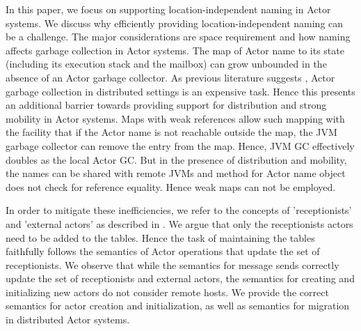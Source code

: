 In this paper, we focus on supporting location-independent naming in Actor systems. We discuss why efficiently providing location-independent naming can be a challenge. The major considerations are space requirement and how naming affects garbage collection in Actor systems. The map of Actor name to its state (including its execution stack and the mailbox) can grow unbounded in the absence of an Actor garbage collector. As previous literature suggests \cite{iwmm92}, Actor garbage collection in distributed settings is an expensive task. Hence this presents an additional barrier towards providing support for distribution and strong mobility in Actor systems. Maps with weak references \cite{weakrefs} allow such mapping with the facility that if the Actor name is not reachable outside the map, the JVM garbage collector can remove the entry from the map. Hence, JVM GC effectively doubles as the local Actor GC. But in the presence of distribution and mobility, the names can be shared with remote JVMs and  method for Actor name object does not check for reference equality. Hence weak maps can not be employed. %

In order to mitigate these inefficiencies, we refer to the concepts of 'receptionists' and 'external actors' as described in \cite{agha1997fac}. We argue that only the receptionists actors need to be added to the tables. Hence the task of maintaining the tables faithfully follows the semantics of Actor operations that update the set of receptionists. We observe that while the semantics for message sends correctly update the set of receptionists and external actors, the semantics for creating and initializing new actors do not consider remote hosts. We provide the correct semantics for actor creation and initialization, as well as semantics for migration in distributed Actor systems.

